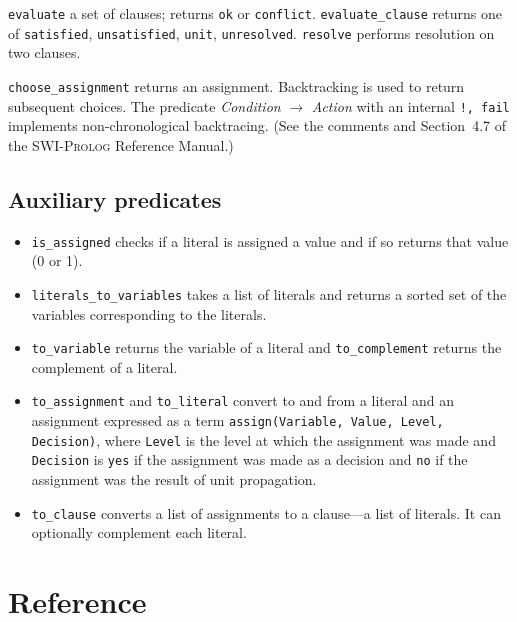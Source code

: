 \documentclass[11pt]{article}
\newcommand*{\p}[1]{\textup{\texttt{#1}}}
\newcommand*{\sw}{\textsc{SWI-Prolog}}
\begin{document}
\p{evaluate} a set of clauses; returns \p{ok} or \p{conflict}.
\p{evaluate\_clause} returns one of \p{satisfied}, \p{unsatisfied},
\p{unit}, \p{unresolved}.
\p{resolve} performs resolution on two clauses.

\p{choose\_assignment} returns an assignment. Backtracking is used to
return subsequent choices. The predicate \emph{Condition} $\rightarrow$
\emph{Action} with an internal \p{!, fail} implements non-chronological
backtracing. (See the comments and Section~4.7 of the \sw{} Reference
Manual.)


\subsection{Auxiliary predicates}\label{s.aux}

\begin{itemize}

\item \p{is\_assigned} checks if a literal is assigned a value
and if so returns that value (0 or 1).

\item \p{literals\_to\_variables} takes a list of literals and returns a
sorted set of the variables corresponding to the literals.

\item \p{to\_variable} returns the variable of a literal and
\p{to\_complement} returns the complement of a literal.

\item \p{to\_assignment} and \p{to\_literal} convert to and from a
literal and an assignment expressed as a term \p{assign(Variable, Value,
Level, Decision)}, where \p{Level} is the level at which the assignment
was made and \p{Decision} is \p{yes} if the assignment was
made as a decision and \p{no} if the assignment was the result of unit
propagation.

\item \p{to\_clause} converts a list of assignments to a clause---a list
of literals. It can optionally complement each literal.

\end{itemize}





\newpage

\appendix
\section{Reference}
\end{document}
